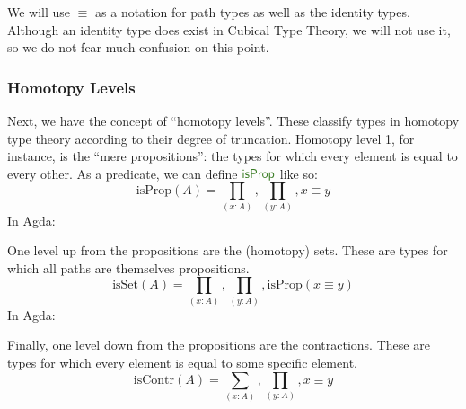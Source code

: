 \begin{subappendices}
We will use \(\equiv\) as a notation for path types as well as the identity
types.
Although an identity type does exist in Cubical Type Theory, we will not use it,
so we do not fear much confusion on this point.
\subsubsection{Homotopy Levels}
Next, we have the concept of ``homotopy levels''.
These classify types in homotopy type theory according to their degree of
truncation.
Homotopy level 1, for instance, is the ``mere propositions'': the types for
which every element is equal to every other.
As a predicate, we can define \(\AgdaFunction{isProp}\) like so:
\begin{equation}
  \text{isProp}(A) = \prod_{(x : A)} , \prod_{(y : A)} , x \equiv y
\end{equation}
In Agda:

One level up from the propositions are the (homotopy) sets.
These are types for which all paths are themselves propositions.
\begin{equation}
  \text{isSet}(A) = \prod_{(x : A)} , \prod_{(y : A)} , \text{isProp}(x \equiv y)
\end{equation}
In Agda:

Finally, one level down from the propositions are the contractions.
These are types for which every element is equal to some specific element.
\begin{equation}
  \text{isContr}(A) = \sum_{(x : A)} , \prod_{(y : A)} , x \equiv y
\end{equation}

\end{subappendices}
